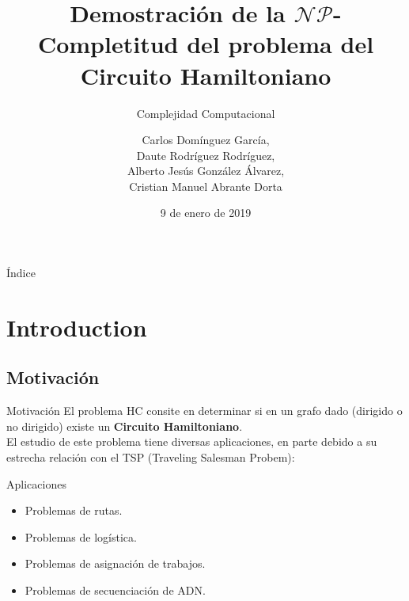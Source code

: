 \documentclass{beamer}
\title[HC $\mathcal{NP}$-Completitud]{Demostración de la $\mathcal{NP}$-Completitud del problema del Circuito Hamiltoniano}
\subtitle{Complejidad Computacional}
\author[C.D.G., D.R.R., A.G.A., C.A.D.]{
    Carlos Domínguez García,\\ 
    Daute Rodríguez Rodríguez,\\ 
    Alberto Jesús González Álvarez,\\
    Cristian Manuel Abrante Dorta
}
\institute[ULL]{Universidad de La Laguna}
\date{9 de enero de 2019}
\begin{document}
\begin{frame}
    \titlepage
\end{frame}

\begin{frame}{Índice}
    \tableofcontents
\end{frame}

\section{Introduction}
\subsection{Motivación}
\begin{frame}{Motivación}
    El problema HC consite en determinar si en un grafo dado (dirigido o no dirigido) existe un \textbf{Circuito Hamiltoniano}. \\
    \vfill
    El estudio de este problema tiene diversas aplicaciones, en parte debido a su estrecha relación con el TSP (Traveling Salesman Probem):
    \begin{block}{Aplicaciones}
        \begin{itemize}
            \item Problemas de rutas.
            \item Problemas de logística.
            \item Problemas de asignación de trabajos.
            \item Problemas de secuenciación de ADN.
        \end{itemize}
    \end{block}
\end{frame}
\end{document}
